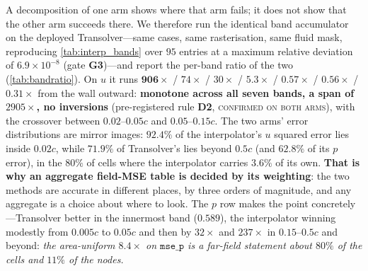 A decomposition of one arm shows where that arm fails; it does not show that the other arm
succeeds there. We therefore run the identical band accumulator on the deployed
Transolver---same cases, same rasterisation, same fluid mask, reproducing
\autoref{tab:interp_bands} over $95$ entries at a maximum relative deviation of
$6.9{\times}10^{-8}$ (gate \textbf{G3})---and report the per-band ratio of the two
(\autoref{tab:bandratio}). On $u$ it runs $\mathbf{906\times}$ / $74\times$ / $30\times$ /
$5.3\times$ / $0.57\times$ / $0.56\times$ / $\mathbf{0.31\times}$ from the wall outward:
\textbf{monotone across all seven bands, a span of $2905\times$, no inversions}
(pre-registered rule \textbf{D2}, \textsc{confirmed on both arms}), with the crossover
between $0.02$--$0.05c$ and $0.05$--$0.15c$. The two arms' error distributions are mirror
images: $92.4\%$ of the interpolator's $u$ squared error lies inside $0.02c$, while
$71.9\%$ of Transolver's lies beyond $0.5c$ (and $62.8\%$ of its $p$ error), in the $80\%$
of cells where the interpolator carries $3.6\%$ of its own. \textbf{That is why an
aggregate field-MSE table is decided by its weighting}: the two methods are accurate in
different places, by three orders of magnitude, and any aggregate is a choice about where
to look. The $p$ row makes the point concretely---Transolver better in the innermost band
($0.589$), the interpolator winning modestly from $0.005c$ to $0.05c$ and then by
$32\times$ and $237\times$ in $0.15$--$0.5c$ and beyond: \emph{the area-uniform $8.4\times$
on $\texttt{mse\_p}$ is a far-field statement about $80\%$ of the cells and $11\%$ of the
nodes.}


